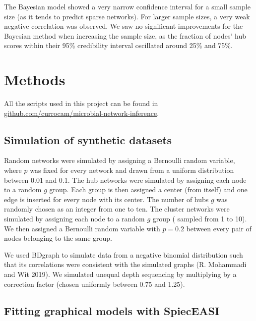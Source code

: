 \documentclass[
  a4paper,
]{article}
\begin{document}
The Bayesian model showed a very narrow confidence interval for a small
sample size (as it tends to predict sparse networks). For larger sample
sizes, a very weak negative correlation was observed. We saw no
significant improvements for the Bayesian method when increasing the
sample size, as the fraction of nodes' hub scores within their 95\%
credibility interval oscillated around 25\% and 75\%.

\hypertarget{methods}{%
\section{Methods}\label{methods}}

All the scripts used in this project can be found in
\href{https://github.com/currocam/microbial-network-inference}{github.com/currocam/microbial-network-inference}.

\hypertarget{simulation-of-synthetic-datasets-1}{%
\subsection{Simulation of synthetic
datasets}\label{simulation-of-synthetic-datasets-1}}

Random networks were simulated by assigning a Bernoulli random variable,
where \(p\) was fixed for every network and drawn from a uniform
distribution between 0.01 and 0.1. The hub networks were simulated by
assigning each node to a random \(g\) group. Each group is then assigned
a center (from itself) and one edge is inserted for every node with its
center. The number of hubs \(g\) was randomly chosen as an integer from
one to ten. The cluster networks were simulated by assigning each node
to a random \(g\) group ( sampled from 1 to 10). We then assigned a
Bernoulli random variable with \(p=0.2\) between every pair of nodes
belonging to the same group.

We used BDgraph to simulate data from a negative binomial distribution
such that its correlations were consistent with the simulated graphs (R.
Mohammadi and Wit 2019). We simulated unequal depth sequencing by
multiplying by a correction factor (chosen uniformly between 0.75 and
1.25).

\hypertarget{fitting-graphical-models-with-spieceasi}{%
\subsection{Fitting graphical models with
SpiecEASI}\label{fitting-graphical-models-with-spieceasi}}
\end{document}
